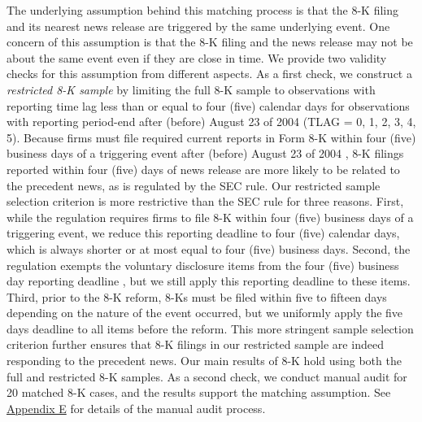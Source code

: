 \documentclass[a4paper]{article}
\begin{document}
\begin{spacing}{2}
The underlying assumption behind this matching process is that the 8-K filing and its nearest news release are triggered by the same underlying event. One concern of this assumption is that the 8-K filing and the news release may not be about the same event even if they are close in time. We provide two validity checks for this assumption from different aspects. As a first check, we construct a \textit{restricted 8-K sample} by limiting the full 8-K sample to observations with reporting time lag less than or equal to four (five) calendar days for observations with reporting period-end after (before) August 23 of 2004 (TLAG = 0, 1, 2, 3, 4, 5). Because firms must file required current reports in Form 8-K within four (five) business days of a triggering event after (before) August 23 of 2004 , 8-K filings reported within four (five) days of news release are more likely to be related to the precedent news, as is regulated by the SEC rule. Our restricted sample selection criterion is more restrictive than the SEC rule for three reasons. First, while the regulation requires firms to file 8-K within four (five) business days of a triggering event, we reduce this reporting deadline to four (five) calendar days, which is always shorter or at most equal to four (five) business days. Second, the regulation exempts the voluntary disclosure items from the four (five) business day reporting deadline \cite{heMeasuringDisclosureUsing2020}, but we still apply this reporting deadline to these items. Third, prior to the 8-K reform, 8-Ks must be filed within five to fifteen days depending on the nature of the event occurred, but we uniformly apply the five days deadline to all items before the reform. This more stringent sample selection criterion further ensures that 8-K filings in our restricted sample are indeed responding to the precedent news. Our main results of 8-K hold using both the full and restricted 8-K samples. As a second check, we conduct manual audit for 20 matched 8-K cases, and the results support the matching assumption. See \hyperref[appe]{Appendix E} for details of the manual audit process.


\end{spacing}
\end{document}
